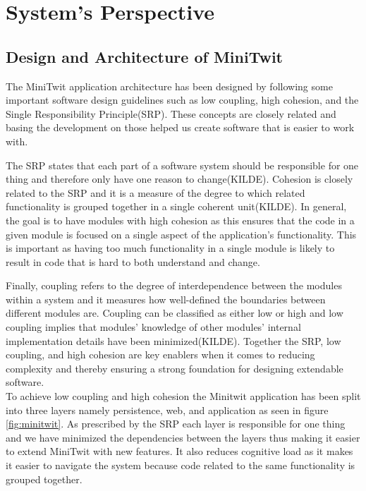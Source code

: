 \section{System's Perspective}

\subsection{Design and Architecture of MiniTwit}
The MiniTwit application architecture has been designed by following some important software design guidelines 
such as low coupling, high cohesion, and the Single Responsibility Principle(SRP). 
These concepts are closely related and basing the development on those helped us create software that is easier to work with. 

The SRP states that each part of a software system should be responsible for one thing and therefore only have one reason to change(KILDE). 
Cohesion is closely related to the SRP and it is a measure of the degree to which related functionality is grouped together in a single coherent unit(KILDE). 
In general, the goal is to have modules with high cohesion as this ensures that the code in a given module is focused on a single aspect of the application's functionality. 
This is important as having too much functionality in a single module is likely to result in code that is hard to both understand and change. 

Finally, coupling refers to the degree of interdependence between the modules within a system and it measures how well-defined the boundaries between different modules are. 
Coupling can be classified as either low or high and low coupling implies that modules' knowledge of other modules' internal implementation details have been minimized(KILDE).
Together the SRP, low coupling, and high cohesion are key enablers when it comes to reducing complexity and thereby ensuring a strong foundation for designing extendable software. \\

To achieve low coupling and high cohesion the Minitwit application has been split into three layers namely persistence, web, and application as seen in figure \ref{fig:minitwit}. 
As prescribed by the SRP each layer is responsible for one thing and we have minimized the dependencies between the layers thus making it easier to extend MiniTwit with new features. 
It also reduces cognitive load as it makes it easier to navigate the system because code related to the same functionality is grouped together. 


